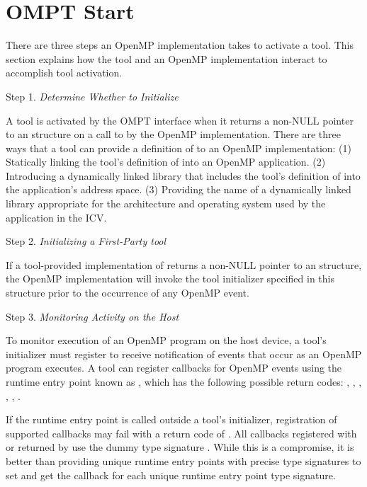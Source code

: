 \pagebreak
\section{OMPT Start}
\label{sec:ompt_start}

There are three steps an OpenMP implementation takes to activate a tool.
This section explains how the tool and an OpenMP implementation interact to accomplish tool activation.

Step 1. \emph{Determine Whether to Initialize}
\begin{adjustwidth}{2.5em}{0pt}
A tool is activated by the OMPT interface when it returns a non-NULL pointer to an  structure on a call to  by the OpenMP implementation.
There are three ways that a tool can provide a definition of  to an OpenMP implementation:
(1) Statically linking the tool's definition of  into an OpenMP application.
(2) Introducing a dynamically linked library that includes the tool's definition of
 into the application's address space.
(3) Providing the name of a dynamically linked library appropriate for the architecture
and operating system used by the application in the  ICV.
\end{adjustwidth}

Step 2. \emph{Initializing a First-Party tool}
\begin{adjustwidth}{2.5em}{0pt}
If a tool-provided implementation of  returns a non-NULL pointer
to an  structure, the OpenMP implementation will invoke
the tool initializer specified in this structure prior to the occurrence of any OpenMP event.
\end{adjustwidth}


Step 3. \emph{Monitoring Activity on the Host}
\begin{adjustwidth}{2.5em}{0pt}
To monitor execution of an OpenMP program on the host device, a tool's initializer
must register to receive notification of events that occur as an OpenMP program executes.
A tool can register callbacks for OpenMP events using the runtime entry point known
as , which has the following possible return codes: \hfill \break
 ,
 ,
 ,
 ,
 ,
 .

If the  runtime entry point is called outside a tool’s initializer,
registration of supported callbacks may fail with a return code of .
All callbacks registered with  or returned by 
use the dummy type signature . While this is a compromise, it is
better than providing unique runtime entry points with precise type signatures
to set and get the callback for each unique runtime entry point type signature.
\end{adjustwidth}

